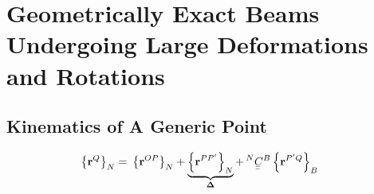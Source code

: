 \documentclass[a4paper]{article}
\newcommand{\ubar}[1]{\underaccent{\bar}{#1}}
\begin{document}
\section*{Geometrically Exact Beams Undergoing Large Deformations and Rotations}
\subsection*{Kinematics of A Generic Point}

\begin{align}
  \left\{ \mathbf{r}^{Q} \right\}_{N} =& \ \left\{ \mathbf{r}^{OP} \right\}_{N} 
  +  \underbrace{\left\{ \mathbf{r}^{PP'} \right\}_{N}}_{\mathbf{\Delta}}
  +  \prescript{N}{}{\ubar{\ubar{C}}}^{B}
  \left\{ \mathbf{r}^{P'Q} \right\}_{B} \ 
  \end{align}
\end{document}
